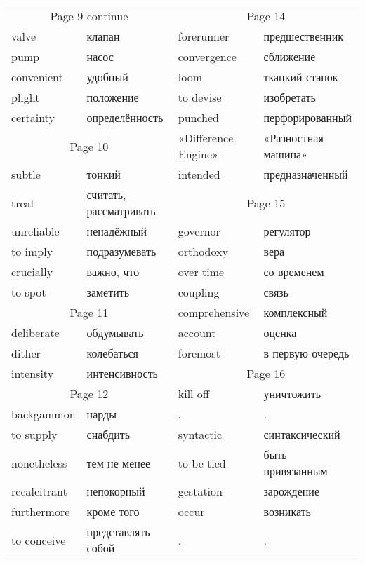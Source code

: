 \documentclass[12pt]{article}
\begin{document}
\begin{tabular}{| l l | l l | }
  \hline

  \multicolumn{2}{|c|}{Page 9 continue} & \multicolumn{2}{c|}{Page 14} \\
  valve & клапан & forerunner & предшественник\\
  pump & насос & convergence & сближение \\
  convenient & удобный & loom & ткацкий станок \\
  plight & положение & to devise & изобретать \\
  certainty & определённость & punched & перфорированный \\

  \cline{1-2}\multicolumn{2}{|c|}{Page 10} & «Difference Engine» & «Разностная машина» \\
  subtle & тонкий & intended & предназначенный \\ \cline{3-4}
  treat & считать, рассматривать & \multicolumn{2}{c|}{Page 15} \\ 
  unreliable & ненадёжный & governor & регулятор \\
  
  to imply & подразумевать & orthodoxy & вера \\ 
  crucially & важно, что & over time & со временем \\
  to spot & заметить & coupling & связь \\
  
  \cline{1-2}\multicolumn{2}{|c|}{Page 11} & comprehensive & комплексный \\
  deliberate & обдумывать & account & оценка \\
  dither & колебаться & foremost & в первую очередь \\  \cline{3-4}
  intensity & интенсивность & \multicolumn{2}{c|}{Page 16} \\

  \cline{1-2}\multicolumn{2}{|c|}{Page 12} & kill off & уничтожить \\
  backgammon & нарды & . & . \\
  to supply & снабдить & syntactic & синтаксический \\
  nonetheless & тем не менее & to be tied & быть привязанным \\ 
  recalcitrant & непокорный & gestation & зарождение \\
  furthermore & кроме того & occur & возникать \\ 
  to conceive & представлять собой & . & .\\


\end{tabular}
\end{document}
